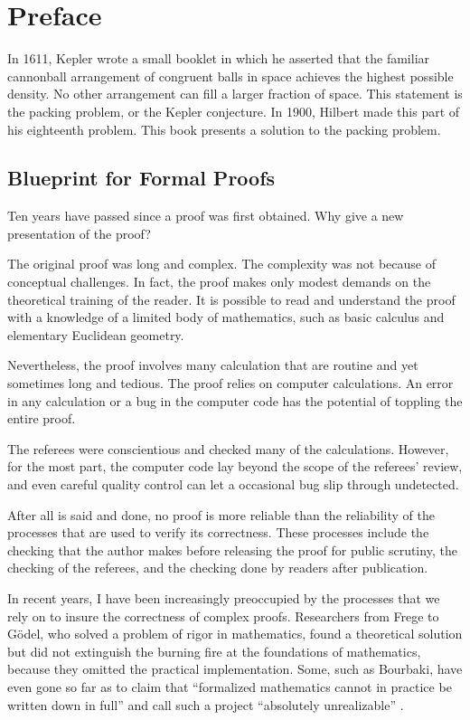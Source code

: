 \chapter{Preface}

In 1611, Kepler wrote a small booklet in which he asserted that the familiar cannonball arrangement of congruent balls in space achieves the highest possible density.  No other arrangement can fill a larger fraction of space.  This statement is the packing problem, or the Kepler conjecture.  In 1900, Hilbert made this part of his eighteenth problem.  This book presents a solution to the packing problem.

\section{Blueprint for Formal Proofs}

Ten years have passed since a proof was first
obtained. Why give a new presentation of the proof?

The original proof was long and complex.  The complexity was not
because of conceptual challenges.  In fact, the proof makes only
modest demands on the theoretical training of the reader.  It is
possible to read and understand the proof with a knowledge of a
limited body of mathematics, such as basic calculus and elementary
Euclidean geometry.

Nevertheless, the proof involves many  calculation that are routine
and yet sometimes long and tedious.  The proof relies on computer calculations.  An error in any calculation or a bug in the
computer code has the potential of toppling the entire proof.

The referees were conscientious and checked many of the
calculations.  However, for the most part, the computer code lay beyond the scope of the referees' review, and even careful quality control can let a occasional bug slip through undetected.


After all is said and done, no proof is more reliable than the
reliability of the processes that are used to verify its
correctness.  These processes include the checking that the author
makes before releasing the proof for public scrutiny, the checking
of the referees, and the checking done by readers after publication.

In recent years, I have been increasingly preoccupied by the
processes that we rely on to insure the correctness of complex
proofs. Researchers from Frege to G\"odel, who solved a problem of
rigor in mathematics, found a theoretical solution but did not
extinguish the burning fire at the foundations of mathematics,
because they omitted the practical implementation. Some, such as
Bourbaki, have even gone so far as to claim that ``formalized
mathematics cannot in practice be written down in full'' and call
such a project
``absolutely unrealizable'' \cite[p 10,11]{Bour:68:Sets}. %

